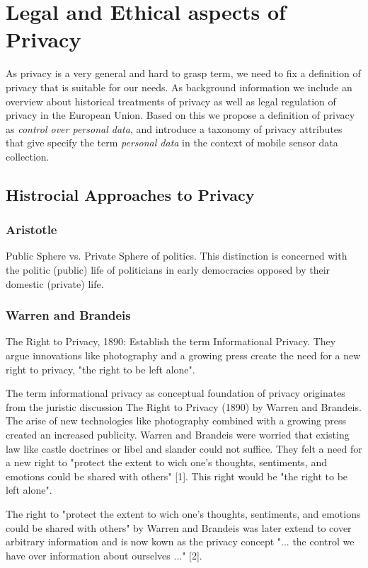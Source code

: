 \chapter{Legal and Ethical aspects of Privacy}
\label{chap:privacy}

As privacy is a very general and hard to grasp term, we need to fix a definition of privacy that is suitable for our needs.
As background information we include an overview about historical treatments of privacy as well as legal regulation of privacy in the European Union.
Based on this we propose a definition of privacy as {\em control over personal data}, and introduce a taxonomy of privacy attributes that give specify the term {\em personal data} in the context of mobile sensor data collection.

\section{Histrocial Approaches to Privacy}

\subsection{Aristotle}

Public Sphere vs. Private Sphere of politics. This distinction is concerned with the politic (public) life of politicians in early democracies opposed by their domestic (private) life.

\subsection{Warren and Brandeis}

The Right to Privacy, 1890: Establish the term Informational Privacy. They argue innovations like photography and a growing press create the need for a new right to privacy, "the right to be left alone".

The term informational privacy as conceptual foundation of privacy originates from the juristic discussion The Right to Privacy (1890) by Warren and Brandeis.
The arise of new technologies like photography combined with a growing press created an increased publicity.
Warren and Brandeis were worried that existing law like castle doctrines or libel and slander could not suffice.
They felt a need for a new right to "protect the extent to wich one's thoughts, sentiments, and emotions could be shared with others" [1].
This right would be "the right to be left alone".

The right to "protect the extent to wich one's thoughts, sentiments, and emotions could be shared with others" by Warren and Brandeis was later extend to cover arbitrary information and is now kown as the privacy concept "... the control we have over information about ourselves ..." [2].

